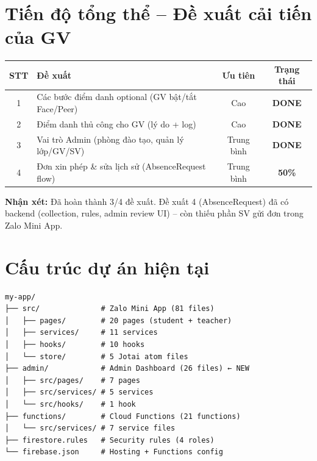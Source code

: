 \documentclass{article}
\begin{document}
\section{Tiến độ tổng thể -- Đề xuất cải tiến của GV}

\begin{center}
\begin{tabularx}{\textwidth}{@{}c X c c@{}}
\toprule
\textbf{STT} & \textbf{Đề xuất} & \textbf{Ưu tiên} & \textbf{Trạng thái} \\
\midrule
1 & Các bước điểm danh optional (GV bật/tắt Face/Peer) & Cao & \textcolor{statusgreen}{\textbf{DONE}} \\
2 & Điểm danh thủ công cho GV (lý do + log) & Cao & \textcolor{statusgreen}{\textbf{DONE}} \\
3 & Vai trò Admin (phòng đào tạo, quản lý lớp/GV/SV) & Trung bình & \textcolor{statusgreen}{\textbf{DONE}} \\
4 & Đơn xin phép \& sửa lịch sử (AbsenceRequest flow) & Trung bình & \textcolor{statusamber}{\textbf{50\%}} \\
\bottomrule
\end{tabularx}
\end{center}

\textbf{Nhận xét:} Đã hoàn thành 3/4 đề xuất. Đề xuất 4 (AbsenceRequest) đã có backend (collection, rules, admin review UI) -- còn thiếu phần SV gửi đơn trong Zalo Mini App.

\section{Cấu trúc dự án hiện tại}

\begin{verbatim}
my-app/
├── src/              # Zalo Mini App (81 files)
│   ├── pages/        # 20 pages (student + teacher)
│   ├── services/     # 11 services
│   ├── hooks/        # 10 hooks
│   └── store/        # 5 Jotai atom files
├── admin/            # Admin Dashboard (26 files) ← NEW
│   ├── src/pages/    # 7 pages
│   ├── src/services/ # 5 services
│   └── src/hooks/    # 1 hook
├── functions/        # Cloud Functions (21 functions)
│   └── src/services/ # 7 service files
├── firestore.rules   # Security rules (4 roles)
└── firebase.json     # Hosting + Functions config
\end{verbatim}
\end{document}
